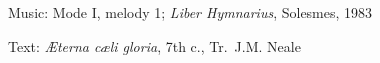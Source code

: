 




\begin{hymnsource}
Music: Mode I, melody 1; \emph{Liber Hymnarius}, Solesmes, 1983

Text: \emph{Æterna cæli gloria}, 7th c., Tr.\ J.M. Neale
\end{hymnsource}
